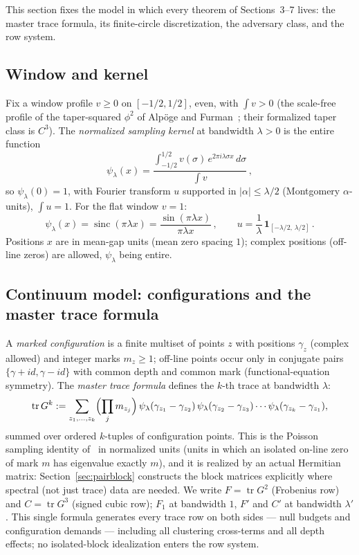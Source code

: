 \documentclass[11pt]{article}
\theoremstyle{plain}
\theoremstyle{definition}
\theoremstyle{remark}
\newcommand{\tr}{\operatorname{tr}}
\newcommand{\sinc}{\operatorname{sinc}}
\newcommand{\one}{\mathbf{1}}
\begin{document}
This section fixes the model in which every theorem of Sections~3--7 lives: the
master trace formula, its finite-circle discretization, the adversary class, and
the row system.

\subsection{Window and kernel}

Fix a window profile $v \ge 0$ on $[-1/2, 1/2]$, even, with $\int v > 0$ (the
scale-free profile of the taper-squared $\phi^2$ of Alp\"oge and
Furman~\cite{AF26}; their formalized taper class is $C^3$). The \emph{normalized
sampling kernel} at bandwidth $\lambda > 0$ is the entire function
\[
  \psi_\lambda(x)
  = \frac{\displaystyle\int_{-1/2}^{1/2} v(\sigma)\,
      e^{2\pi i \lambda \sigma x}\, d\sigma}{\displaystyle\int v}\,,
\]
so $\psi_\lambda(0) = 1$, with Fourier transform $u$ supported in
$|\alpha| \le \lambda/2$ (Montgomery $\alpha$-units), $\int u = 1$. For the flat
window $v = 1$:
\[
  \psi_\lambda(x) = \sinc(\pi \lambda x)
  = \frac{\sin(\pi \lambda x)}{\pi \lambda x}\,,
  \qquad
  u = \frac{1}{\lambda}\,\one_{[-\lambda/2,\, \lambda/2]}\,.
\]
Positions $x$ are in mean-gap units (mean zero spacing $1$); complex positions
(off-line zeros) are allowed, $\psi_\lambda$ being entire.

\subsection{Continuum model: configurations and the master trace formula}
\label{sec:continuum}

A \emph{marked configuration} is a finite multiset of points $z$ with positions
$\gamma_z$ (complex allowed) and integer marks $m_z \ge 1$; off-line points occur
only in conjugate pairs $\{\gamma + i d, \gamma - i d\}$ with common depth and
common mark (functional-equation symmetry). The \emph{master trace formula}
defines the $k$-th trace at bandwidth $\lambda$:
\[
  \tr G^k := \sum_{z_1, \ldots, z_k}
    \Bigl( \prod_j m_{z_j} \Bigr)\,
    \psi_\lambda(\gamma_{z_1} - \gamma_{z_2})\,
    \psi_\lambda(\gamma_{z_2} - \gamma_{z_3}) \cdots
    \psi_\lambda(\gamma_{z_k} - \gamma_{z_1}),
\]
summed over ordered $k$-tuples of configuration points. This is the Poisson
sampling identity of~\cite{AF26} in normalized units (units in which an isolated
on-line zero of mark $m$ has eigenvalue exactly $m$), and it is realized by an
actual Hermitian matrix: Section~\ref{sec:pairblock} constructs the block
matrices explicitly where spectral (not just trace) data are needed. We write
$F = \tr G^2$ (Frobenius row) and $C = \tr G^3$ (signed cubic row); $F_1$ at
bandwidth $1$, $F'$ and $C'$ at bandwidth $\lambda'$. This single formula
generates every trace row on both sides --- null budgets and configuration
demands --- including all clustering cross-terms and all depth effects; no
isolated-block idealization enters the row system.
\end{document}
